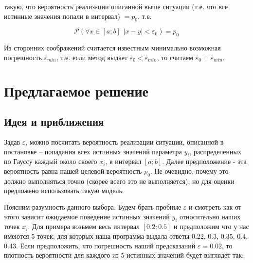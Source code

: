 \documentclass[a4paper,12pt]{article} %
\begin{document}
такую, что вероятность реализации описанной выше ситуации (т.е. что все истинные значения попали в интервал) $ = p_0$, т.е.

\begin{equation}
\mathcal{P}(\forall x \in [a;b] \hspace{5pt} |x - y| < \varepsilon_0) = p_0
\end{equation}

Из сторонних соображений считается известным минимально возможная погрешность $\varepsilon_{min}$, т.е. если метод выдает $\varepsilon_0 < \varepsilon_{min}$, то считаем $\varepsilon_0 = \varepsilon_{min}$.

\newpage

\section{Предлагаемое решение}

\subsection{Идея и приближения}

Задав $\varepsilon$, можно посчитать вероятность реализации ситуации, описанной в постановке -- попадания всех истинных значений параметра $y_i$, распределенных по Гауссу каждый около своего $x_i$, в интервал $[a;b]$. Далее предположение - эта вероятность равна нашей целевой вероятность $p_0$. Не очевидно, почему это должно выполняться точно (скорее всего это не выполняется), но для оценки предложено использовать такую модель. 

Поясним разумность данного выбора. Будем брать пробные $\varepsilon$ и смотреть как от этого зависит ожидаемое поведение истинных значений $y_i$ относительно наших точек $x_i$. Для примера возьмем весь интервал $[0.2; 0.5]$ и предположим что у нас имеются 5 точек, для которых наша программа выдала ответы 0.22, 0.3, 0.35, 0.4, 0.43. Если предположить, что погрешность наший предсказаний $\varepsilon = 0.02$, то плотность вероятности для каждого из 5 истинных значений будет выглядет так:
\end{document}
